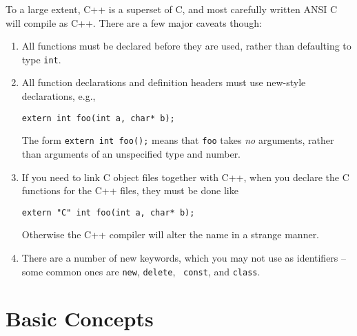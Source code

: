 To a large extent, C++ is a superset of C, and most carefully written
ANSI C will compile as C++.  There are a few major caveats though:
\begin{enumerate}
\item All functions must be declared before they are used, rather than
defaulting to type {\tt int}.
\item All function declarations and definition headers must use
new-style declarations, e.g.,
\begin{verbatim}
extern int foo(int a, char* b);
\end{verbatim}
The form {\tt extern int foo();} means that {\tt foo} takes {\it no}
arguments, rather than arguments of an unspecified type and number.
\item If you need to link C object files together with C++, when you
declare the C functions for the C++ files, they must be done like
\begin{verbatim}
extern "C" int foo(int a, char* b);
\end{verbatim}
Otherwise the C++ compiler will
alter the name in a strange manner.
\item There are a number of new keywords, which you may not use as
identifiers -- some common ones are {\tt new}, {\tt delete}, {\tt
const}, and {\tt class}.
\end{enumerate}

\section{Basic Concepts}

